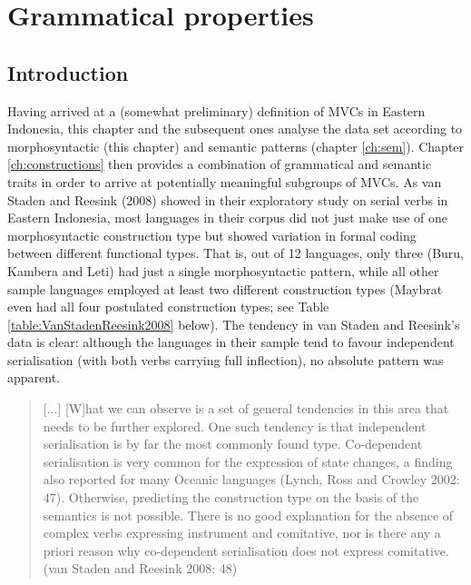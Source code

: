 \chapter{Grammatical properties}\label{ch:gram}
\section{Introduction}

Having arrived at a (somewhat preliminary) definition of MVCs in Eastern Indonesia, this chapter and the subsequent ones analyse the data set according to morphosyntactic (this chapter) and semantic patterns (chapter \ref{ch:sem}). Chapter \ref{ch:constructions} then provides a combination of grammatical and semantic traits in order to arrive at potentially meaningful subgroups of MVCs. As van Staden and Reesink (2008) showed in their exploratory study on serial verbs in Eastern Indonesia, most languages in their corpus did not just make use of one morphosyntactic construction type but showed variation in formal coding between different functional types. That is, out of 12 languages, only three (Buru, Kambera and Leti) had just a single morphosyntactic pattern, while all other sample languages employed at least two different construction types (Maybrat even had all four postulated construction types; see Table \ref{table:VanStadenReesink2008} below). The tendency in van Staden and Reesink's data is clear: although the languages in their sample tend to favour independent serialisation (with both verbs carrying full inflection), no absolute pattern was apparent.

\begin{quote}
[...] [W]hat we can observe is a set of general tendencies in this area that needs to be further explored. One such tendency is that independent serialisation is by far the most commonly found type. Co-dependent serialisation is very common for the expression of state changes, a finding also reported for many Oceanic languages (Lynch, Ross and Crowley 2002: 47). Otherwise, predicting the construction type on the basis of the semantics is not possible. There is no good explanation for the absence of complex verbs expressing instrument and comitative, nor is there any a priori reason why co-dependent serialisation does not express comitative. (van Staden and Reesink 2008: 48)
\end{quote}

